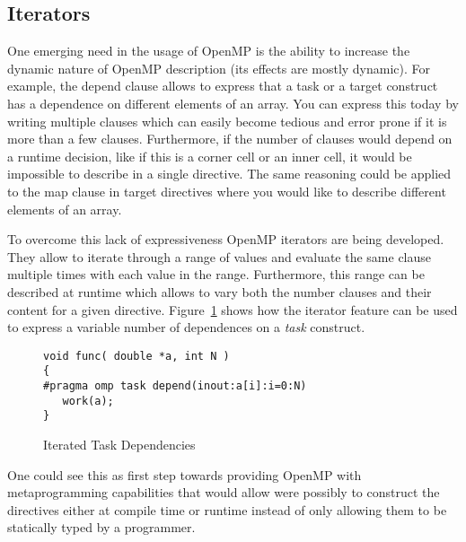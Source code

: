 \subsection{Iterators}
\label{sub:iterators}

One emerging need in the usage of OpenMP is the ability to increase the dynamic
nature of OpenMP description (its effects are mostly dynamic). For example, the
depend clause allows to express that a task or a target construct has
a dependence on different elements of an array. You can express this today by
writing multiple clauses which can easily become tedious and error prone if it
is more than a few clauses. Furthermore, if the number of clauses would depend
on a runtime decision, like if this is a corner cell or an inner cell, it would
be impossible to describe in a single directive. The same reasoning could be
applied to the map clause in target directives where you would like to describe
different elements of an array.
   
To overcome this lack of expressiveness OpenMP iterators are being developed.
They allow to iterate through a range of values and evaluate the same clause
multiple times with each value in the range. Furthermore, this range can be
described at runtime which allows to vary both the number clauses and their
content for a given directive. Figure~\ref{fig:iterators} shows how the iterator
feature can be used to express a variable number of dependences on a \emph{task}
construct.

\begin{figure}
\begin{verbatim}
void func( double *a, int N )
{
#pragma omp task depend(inout:a[i]:i=0:N)
   work(a);
}
\end{verbatim}
\caption{Iterated Task Dependencies}
\label{fig:iterators}
\end{figure}
   
One could see this as first step towards providing OpenMP with metaprogramming
capabilities that would allow were possibly to construct the directives either
at compile time or runtime instead of only allowing them to be statically typed
by a programmer.


   

